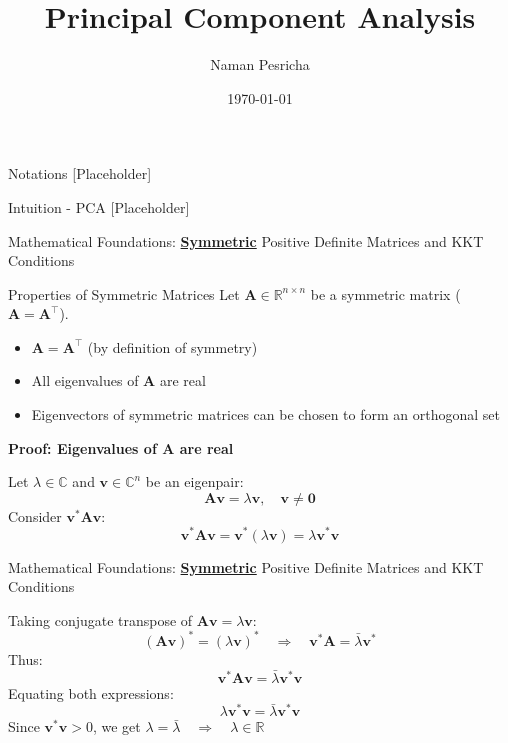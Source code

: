 \documentclass{beamer}
\title{Principal Component Analysis}
\author{Naman Pesricha}
\date{\today}
\begin{document}
\begin{frame}
    \titlepage
\end{frame}

\begin{frame}{Notations}
    [Placeholder]
\end{frame}

\begin{frame}{Intuition - PCA}
    [Placeholder]
\end{frame}

\begin{frame}{Mathematical Foundations: \textbf{\underline{Symmetric}} Positive Definite Matrices and KKT Conditions}

\begin{block}{Properties of Symmetric Matrices}
    Let $\bm{A} \in \mathbb{R}^{n \times n}$ be a symmetric matrix ($\bm{A} = \bm{A}^{\top}$).
    
    \begin{itemize}
        \item $\bm{A} = \bm{A}^{\top}$ (by definition of symmetry)
        \item All eigenvalues of $\bm{A}$ are real
        \item Eigenvectors of symmetric matrices can be chosen to form an orthogonal set
    \end{itemize}
\end{block}

\vspace{0.3cm}

\textbf{Proof: Eigenvalues of $\bm{A}$ are real}  

Let $\lambda \in \mathbb{C}$ and $\bm{v} \in \mathbb{C}^n$ be an eigenpair:
\[
\bm{A}\bm{v} = \lambda \bm{v}, \quad \bm{v} \neq \bm{0}
\]
Consider $\bm{v}^* \bm{A} \bm{v}$:
\[
\bm{v}^* \bm{A} \bm{v} = \bm{v}^* (\lambda \bm{v}) = \lambda \bm{v}^* \bm{v}
\]

\end{frame}

\begin{frame}{Mathematical Foundations: \textbf{\underline{Symmetric}} Positive Definite Matrices and KKT Conditions}

Taking conjugate transpose of $\bm{A}\bm{v} = \lambda \bm{v}$:
\[
(\bm{A}\bm{v})^* = (\lambda \bm{v})^* \quad \Rightarrow \quad \bm{v}^* \bm{A} = \bar{\lambda} \bm{v}^*
\]
Thus:
\[
\bm{v}^* \bm{A} \bm{v} = \bar{\lambda} \bm{v}^* \bm{v}
\]
Equating both expressions:
\[
\lambda \bm{v}^* \bm{v} = \bar{\lambda} \bm{v}^* \bm{v}
\]
Since $\bm{v}^* \bm{v} > 0$, we get $\boxed{\lambda = \bar{\lambda} \quad \Rightarrow \quad \lambda \in \mathbb{R}}$

\end{frame}
\end{document}
